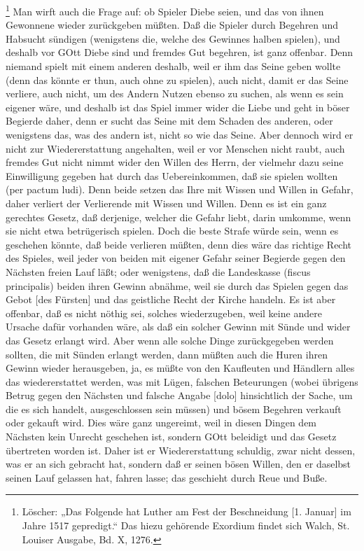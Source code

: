 \footnote{Löscher: „Das Folgende hat Luther am Fest der Beschneidung [1. Januar] im Jahre 1517 gepredigt.“ Das hiezu gehörende Exordium findet sich Walch, St. Louiser Ausgabe, Bd. X, 1276.} Man wirft auch die Frage auf: ob Spieler Diebe seien, und das von ihnen Gewonnene wieder zurückgeben müßten. Daß die Spieler durch Begehren und Habsucht sündigen (wenigstens die, welche des Gewinnes halben spielen), und deshalb vor GOtt Diebe sind und fremdes Gut begehren, ist ganz offenbar. Denn niemand spielt mit einem anderen deshalb, weil er ihm das Seine geben wollte (denn das könnte er thun, auch ohne zu spielen), auch nicht, damit er das Seine verliere, auch nicht, um des Andern Nutzen ebenso zu suchen, als wenn es sein eigener wäre, und deshalb ist das Spiel immer wider die Liebe und geht in böser Begierde daher, denn er sucht das Seine mit dem Schaden des anderen, oder wenigstens das, was des andern ist, nicht so wie das Seine. Aber dennoch wird er nicht zur Wiedererstattung angehalten, weil er vor Menschen nicht raubt, auch fremdes Gut nicht nimmt wider den Willen des Herrn, der vielmehr dazu seine Einwilligung gegeben hat durch das Uebereinkommen, daß sie spielen wollten (per pactum ludi). Denn beide setzen das Ihre mit Wissen und Willen in Gefahr, daher verliert der Verlierende mit Wissen und Willen. Denn es ist ein ganz gerechtes Gesetz, daß derjenige, welcher die Gefahr liebt, darin umkomme, wenn sie nicht etwa betrügerisch spielen. Doch die beste Strafe würde sein, wenn es geschehen könnte, daß beide verlieren müßten, denn dies wäre das richtige Recht des Spieles, weil jeder von beiden mit eigener Gefahr seiner Begierde gegen den Nächsten freien Lauf läßt; oder wenigstens, daß die Landeskasse (fiscus principalis) beiden ihren Gewinn abnähme, weil sie durch das Spielen gegen das Gebot [des Fürsten] und das geistliche Recht der Kirche handeln. Es ist aber offenbar, daß es nicht nöthig sei, solches wiederzugeben, weil keine andere Ursache dafür vorhanden wäre, als daß ein solcher Gewinn mit Sünde und wider das Gesetz erlangt wird. Aber wenn alle solche Dinge zurückgegeben werden sollten, die mit Sünden erlangt werden, dann müßten auch die Huren ihren Gewinn wieder herausgeben, ja, es müßte von den Kaufleuten und Händlern alles das wiedererstattet werden, was mit Lügen, falschen Beteurungen (wobei übrigens Betrug gegen den Nächsten und falsche Angabe [dolo] hinsichtlich der Sache, um die es sich handelt, ausgeschlossen sein müssen) und bösem Begehren verkauft oder gekauft wird. Dies wäre ganz ungereimt, weil in diesen Dingen dem Nächsten kein Unrecht geschehen ist, sondern GOtt beleidigt und das Gesetz übertreten worden ist. Daher ist er Wiedererstattung schuldig, zwar nicht dessen, was er an sich gebracht hat, sondern daß er seinen bösen Willen, den er daselbst seinen Lauf gelassen hat, fahren lasse; das geschieht durch Reue und Buße.

